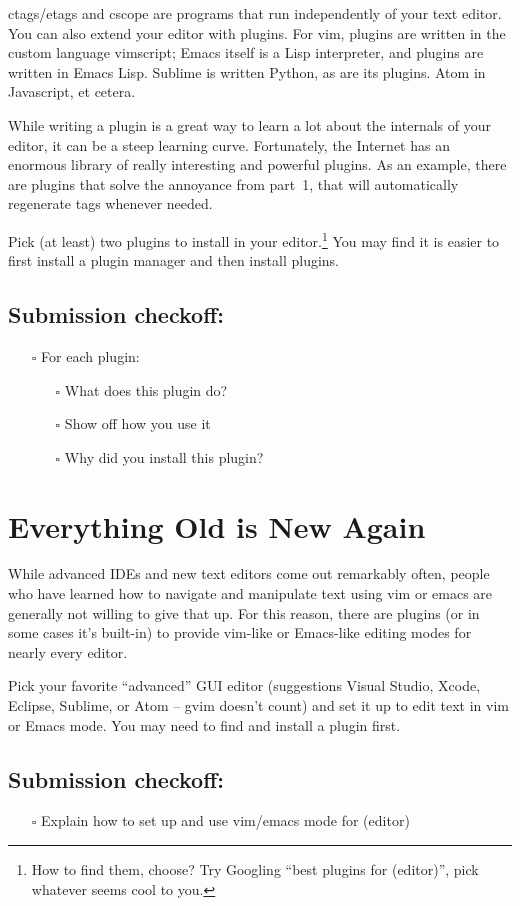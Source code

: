 \documentclass{article}
\begin{document}
ctags/etags and cscope are programs that run independently of your text
editor. You can also extend your editor with plugins. For vim, plugins are
written in the custom language vimscript; Emacs itself is a Lisp interpreter,
and plugins are written in Emacs Lisp. Sublime is written Python, as are its
plugins. Atom in Javascript, et cetera.

While writing a plugin is a great way to learn a lot about the internals of
your editor, it can be a steep learning curve. Fortunately, the Internet has
an enormous library of really interesting and powerful plugins.
As an example, there are plugins that solve the annoyance from part~1, that
will automatically regenerate tags whenever needed.

Pick (at least) two plugins to install in your editor.\footnote{%
  How to find them, choose? Try Googling ``best plugins for (editor)'', pick
  whatever seems cool to you.
} You may find it is easier to first install a plugin manager and then install
plugins.

\subsection*{Submission checkoff:}
\begin{itemize}
  \item[$\square$] For each plugin:
    \begin{itemize}
      \item[$\square$] What does this plugin do?
      \item[$\square$] Show off how you use it
      \item[$\square$] Why did you install this plugin?
    \end{itemize}
\end{itemize}


\section{Everything Old is New Again}

While advanced IDEs and new text editors come out remarkably often, people who
have learned how to navigate and manipulate text using vim or emacs are
generally not willing to give that up.
For this reason, there are plugins (or in some cases it's built-in) to provide
vim-like or Emacs-like editing modes for nearly every editor.

Pick your favorite ``advanced'' GUI editor (suggestions Visual Studio, Xcode,
Eclipse, Sublime, or Atom -- gvim doesn't count) and set it up to edit text in
vim or Emacs mode. You may need to find and install a plugin first.

\subsection*{Submission checkoff:}
\begin{itemize}
  \item[$\square$] Explain how to set up and use vim/emacs mode for (editor)
\end{itemize}
\end{document}
